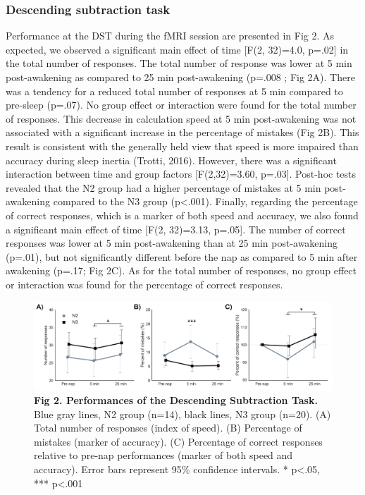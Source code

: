 \subsubsection*{Descending subtraction task}
Performance at the DST during the fMRI session are presented in Fig 2. As expected, we observed a significant main effect of time [F(2, 32)=4.0, p=.02] in the total number of responses. The total number of response was lower at 5 min post-awakening as compared to 25 min post-awakening (p=.008 ; Fig 2A). There was a tendency for a reduced total number of responses at 5 min compared to pre-sleep (p=.07). No group effect or interaction were found for the total number of responses. This decrease in calculation speed at 5 min post-awakening was not associated with a significant increase in the percentage of mistakes (Fig 2B). This result is consistent with the generally held view that speed is more impaired than accuracy during sleep inertia (Trotti, 2016). However, there was a significant interaction between time and group factors [F(2,32)=3.60, p=.03]. Post-hoc tests revealed that the N2 group had a higher percentage of mistakes at 5 min post-awakening compared to the N3 group (p<.001). Finally, regarding the percentage of correct responses, which is a marker of both speed and accuracy, we also found a significant main effect of time [F(2, 32)=3.13, p=.05]. The number of correct responses was lower at 5 min post-awakening than at 25 min post-awakening (p=.01), but not significantly different before the nap as compared to 5 min after awakening (p=.17; Fig 2C). As for the total number of responses, no group effect or interaction was found for the percentage of correct responses.

\begin{figure}[htb]
	\includegraphics[width=\textwidth]{Fig/Results/Inertia/Inertia/Fig2_DST.png}
	\caption*{\textbf{Fig 2. Performances of the Descending Subtraction Task.} Blue gray lines, N2 group (n=14), black lines, N3 group (n=20). (A) Total number of responses (index of speed). (B) Percentage of mistakes (marker of accuracy). (C) Percentage of correct responses relative to pre-nap performances (marker of both speed and accuracy). Error bars represent 95\% confidence intervals. * p<.05, *** p<.001}
\end{figure}

